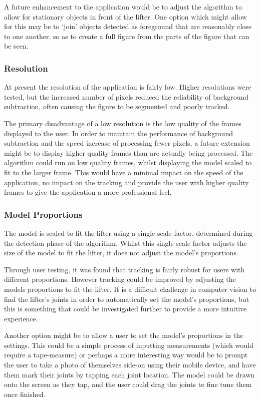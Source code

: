 A future enhancement to the application would be to adjust the algorithm to allow for stationary objects in front of the lifter. One option which might allow for this may be to `join' objects detected as foreground that are reasonably close to one another, so as to create a full figure from the parts of the figure that can be seen.

\subsubsection{Resolution}

At present the resolution of the application is fairly low. Higher resolutions were tested, but the increased number of pixels reduced the reliability of background subtraction, often causing the figure to be segmented and poorly tracked.

The primary disadvantage of a low resolution is the low quality of the frames displayed to the user. In order to maintain the performance of background subtraction and the speed increase of processing fewer pixels, a future extension might be to display higher quality frames than are actually being processed. The algorithm could run on low quality frames, whilst displaying the model scaled to fit to the larger frame. This would have a minimal impact on the speed of the application, no impact on the tracking and provide the user with higher quality frames to give the application a more professional feel.

\subsubsection{Model Proportions}

The model is scaled to fit the lifter using a single scale factor, determined during the detection phase of the algorithm. Whilst this single scale factor adjusts the size of the model to fit the lifter, it does not adjust the model's proportions.

Through user testing, it was found that tracking is fairly robust for users with different proportions. However tracking could be improved by adjusting the models proportions to fit the lifter. It is a difficult challenge in computer vision to find the lifter's joints in order to automatically set the model's proportions, but this is something that could be investigated further to provide a more intuitive experience.

Another option might be to allow a user to set the model's proportions in the settings. This could be a simple process of inputting measurements (which would require a tape-measure) or perhaps a more interesting way would be to prompt the user to take a photo of themselves side-on using their mobile device, and have them mark their joints by tapping each joint location. The model could be drawn onto the screen as they tap, and the user could drag the joints to fine tune them once finished.

